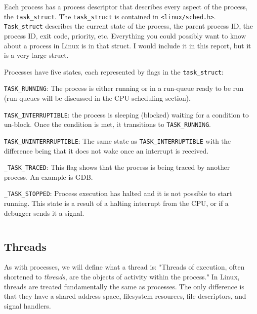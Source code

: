 \documentclass[10pt,letterpaper,onecolumn,draftclsnofoot]{IEEEtran}
\begin{document}
Each process has a process descriptor that describes every aspect of
the process, the \texttt{task\_struct}. The \texttt{task\_struct} is contained
in \texttt{<linux/sched.h>}. \texttt{Task\_struct} describes the current state
of the process, the parent process ID, the process ID, exit code, priority, etc.
Everything you could possibly want to know about a process in Linux is in that
struct. I would include it in this report, but it is a very large struct.

Processes have five states, each represented by flags in the
\texttt{task\_struct}:

\begin{description}
  \item \texttt{TASK\_RUNNING}: The process is either running or in a run-queue
  ready to be run (run-queues will be discussed in the CPU scheduling section).
  \item \texttt{TASK\_INTERRUPTIBLE}: the process is sleeping (blocked) waiting
  for a condition to un-block. Once the condition is met, it transitions to
  \texttt{TASK\_RUNNING}.
  \item \texttt{TASK\_UNINTERRRUPTIBLE}: The same state as \texttt{TASK\_INTERRUPTIBLE}
  with the difference being that it does not wake once an interrupt is received.
  \item \texttt{\_TASK\_TRACED}: This flag shows that the process is being traced
  by another process. An example is GDB.
  \item \texttt{\_TASK\_STOPPED}: Process execution has halted and it is not
  possible to start running. This state is a result of a halting interrupt from
  the CPU, or if a debugger sends it a signal.
\end{description}

 \begin{lstlisting}

 \end{lstlisting}

  \subsection{Threads}
As with processes, we will define what a thread is: "Threads of execution, often
shortened to \textit{threads}, are the objects of activity within the process."
\cite{robertlove2010} In Linux, threads are treated fundamentally the same as
processes. The only difference is that they have a shared address space,
filesystem resources, file descriptors, and signal handlers.
\end{document}
